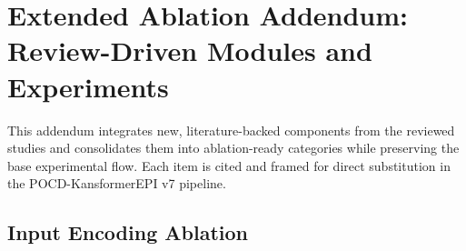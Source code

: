 \documentclass[11pt,a4paper]{article}
\begin{document}
\appendix
\section{Extended Ablation Addendum: Review-Driven Modules and Experiments}
\label{sec:addendum}

This addendum integrates new, literature-backed components from the reviewed studies and consolidates them into ablation-ready categories while preserving the base experimental flow. Each item is cited and framed for direct substitution in the POCD-KansformerEPI v7 pipeline.

\subsection{Input Encoding Ablation}
\end{document}
